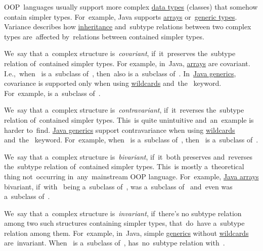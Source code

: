 OOP~languages usually support more complex \hyperref[datatypes]{data types} (classes) that somehow contain simpler types.
For~example, Java supports \hyperref[javaarray]{arrays} or~\hyperref[javagenerics]{generic types}.
Variance describes how \hyperref[inheritance]{inheritance} and~subtype relations between two complex types are~affected by~relations between contained simpler types.

\label{covariance}
We~say that a~complex structure \mbox{is \textit{covariant}}, if~it~preserves the~subtype relation of~contained simpler types.
For example, in~Java, \hyperref[javaarray]{arrays} are covariant.
\mbox{I.e., when } is a~subclass \mbox{of }, then~also  is a~subclass \mbox{of }.
In~\hyperref[javagenerics]{Java generics}, covariance is supported only when using \hyperref[javagenericswildcards]{wildcards} \mbox{and the } keyword.
For~example,  is a~subclass \mbox{of }.

We~say that a~complex structure \mbox{is \textit{contravariant}}, if~it~reverses the~subtype relation of~contained simpler types.
This~is quite unintuitive and~an~example is harder to~find.
\hyperref[javagenerics]{Java generics} support contravariance when using \hyperref[javagenericswildcards]{wildcards} \mbox{and the } keyword.
For~example, \mbox{when } is a~subclass \mbox{of }, \mbox{then } is a~subclass \mbox{of }.

We~say that a~complex structure \mbox{is \textit{bivariant}}, if~it~both preserves and~reverses the~subtype relation of~contained simpler types.
This~is mostly a~theoretical thing not~occurring in~any~mainstream OOP language.
For~example, \hyperref[javaarray]{Java arrays}  bivariant, \mbox{if with } being a~subclass \mbox{of },  was a~subclass \mbox{of } and~even  was a~subclass \mbox{of }.

\label{invariance}
We~say that a~complex structure \mbox{is \textit{invariant}}, if~there's no subtype relation among two such structures containing simpler types, that~do~have a~subtype relation among them.
For~example, in~Java, simple \hyperref[javagenerics]{generics} without \hyperref[javagenericswildcards]{wildcards} are~invariant.
\mbox{When } is a~subclass \mbox{of },  has~no~subtype relation \mbox{with }.
